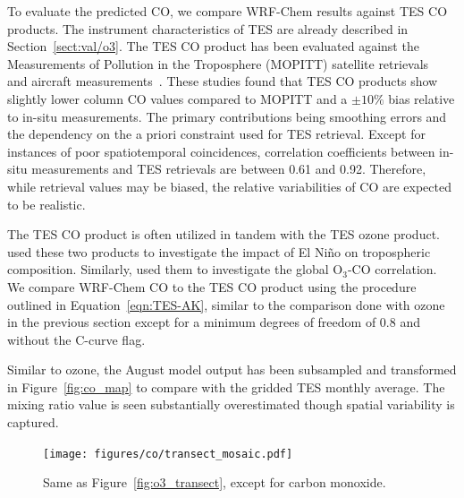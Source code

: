 To evaluate the predicted CO, we compare WRF-Chem results
against TES CO products. The instrument characteristics of TES are already described
in Section~\ref{sect:val/o3}. The TES CO product has been evaluated against the
Measurements of Pollution in the Troposphere (MOPITT) satellite
retrievals~\citep{Luo:2007ly,Ho:2009lh} and aircraft
measurements~\citep{Luo:2007vn,Lopez:2008ys}. These studies found that TES CO products
show slightly lower column CO values compared to MOPITT and a $\pm10\%$ bias
relative to in-situ measurements. The primary contributions being smoothing errors
and the dependency on the a priori constraint used for TES retrieval. Except for instances
of poor spatiotemporal coincidences, correlation coefficients between in-situ measurements
and TES retrievals are between 0.61 and 0.92. Therefore, while retrieval values may
be biased, the relative variabilities of CO are expected to be realistic.

The TES CO product is often utilized in tandem with the TES ozone product.
\citet{Logan:2008uq} used these two products to investigate the impact of El Ni\~no
on tropospheric composition. Similarly, \citet{Voulgarakis:2011fk} used them to
investigate the global O$_3$-CO correlation. We compare WRF-Chem CO
to the TES CO product using the procedure outlined in Equation~\ref{eqn:TES-AK},
similar to the comparison done with ozone in the  previous section except for a
minimum degrees of freedom of 0.8 and without the C-curve flag.

Similar to ozone, the August model output has been subsampled and transformed
in Figure~\ref{fig:co_map} to compare with the gridded TES monthly average. The mixing
ratio value is seen substantially overestimated though spatial variability is captured.

 \begin{figure}
 \texttt{[image: figures/co/transect\_mosaic.pdf]}
 \caption{Same as Figure~\ref{fig:o3_transect}, except for carbon monoxide.}
 \label{fig:co_transect}
 \end{figure}

